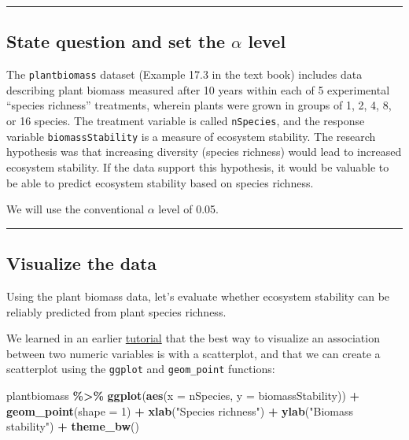 \documentclass[
]{book}
\newenvironment{Shaded}{\begin{snugshade}}{\end{snugshade}}
\newcommand{\AttributeTok}[1]{\textcolor[rgb]{0.13,0.29,0.53}{#1}}
\newcommand{\DecValTok}[1]{\textcolor[rgb]{0.00,0.00,0.81}{#1}}
\newcommand{\FunctionTok}[1]{\textcolor[rgb]{0.13,0.29,0.53}{\textbf{#1}}}
\newcommand{\NormalTok}[1]{#1}
\newcommand{\SpecialCharTok}[1]{\textcolor[rgb]{0.81,0.36,0.00}{\textbf{#1}}}
\newcommand{\StringTok}[1]{\textcolor[rgb]{0.31,0.60,0.02}{#1}}
\begin{document}
\begin{center}\rule{0.5\linewidth}{0.5pt}\end{center}

\subsection{\texorpdfstring{State question and set the \(\alpha\) level}{State question and set the \textbackslash alpha level}}\label{LSR_alpha}

The \texttt{plantbiomass} dataset (Example 17.3 in the text book) includes data describing plant biomass measured after 10 years within each of 5 experimental ``species richness'' treatments, wherein plants were grown in groups of 1, 2, 4, 8, or 16 species. The treatment variable is called \texttt{nSpecies}, and the response variable \texttt{biomassStability} is a measure of ecosystem stability. The research hypothesis was that increasing diversity (species richness) would lead to increased ecosystem stability. If the data support this hypothesis, it would be valuable to be able to predict ecosystem stability based on species richness.

We will use the conventional \(\alpha\) level of 0.05.

\begin{center}\rule{0.5\linewidth}{0.5pt}\end{center}

\subsection{Visualize the data}\label{LSR_vis}

Using the plant biomass data, let's evaluate whether ecosystem stability can be reliably predicted from plant species richness.

We learned in an earlier \hyperref[two_numeric]{tutorial} that the best way to visualize an association between two numeric variables is with a scatterplot, and that we can create a scatterplot using the \texttt{ggplot} and \texttt{geom\_point} functions:

\begin{Shaded}
\begin{Highlighting}[]
\NormalTok{plantbiomass }\SpecialCharTok{\%\textgreater{}\%}
\FunctionTok{ggplot}\NormalTok{(}\FunctionTok{aes}\NormalTok{(}\AttributeTok{x =}\NormalTok{ nSpecies, }\AttributeTok{y =}\NormalTok{ biomassStability)) }\SpecialCharTok{+}
  \FunctionTok{geom\_point}\NormalTok{(}\AttributeTok{shape =} \DecValTok{1}\NormalTok{) }\SpecialCharTok{+}
  \FunctionTok{xlab}\NormalTok{(}\StringTok{"Species richness"}\NormalTok{) }\SpecialCharTok{+}
  \FunctionTok{ylab}\NormalTok{(}\StringTok{"Biomass stability"}\NormalTok{) }\SpecialCharTok{+}
  \FunctionTok{theme\_bw}\NormalTok{()}
\end{Highlighting}
\end{Shaded}
\end{document}
